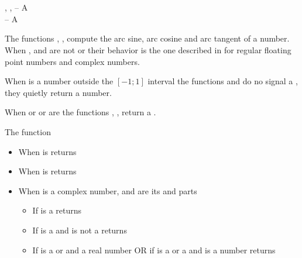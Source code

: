 \documentclass[../Exponentials-Logarithms-Trigonometry.tex]{subfiles}
\begin{document}

\DSyntax{}

  \RArrow {}\\
  \RArrow {}\\
    \RArrow
{}

\DArgsNValues{}

, ,  -- A \\
 -- A 

\DDescription{}

The functions , ,  compute the
arc sine, arc cosine and arc tangent of a number. When ,
 and  are not
 or  their behavior is the
one described in \cite{1996:ANSIHyperSpec} for regular floating
point numbers and complex numbers.

\noindent
When  is a  number outside the $[-1; 1]$
interval the functions  and  do no signal a
, they quietly return a
 number.

\noindent
When  or  or  are
 the functions , ,
 return a .

\noindent
The function 
\begin{itemize}
\item When  is  returns

\item When  is  returns

\item When  is a complex number,  and 
  are its  and  parts
  \begin{itemize}
  \item If  is a  returns \code{))))}
  \item If  is a  and  is not a
     returns 
  \item If  is a  or
     and  a real number OR if  is
    a  or a  and  is
    a   number returns \code{) }
  \end{itemize}
\end{itemize}
\end{document}
